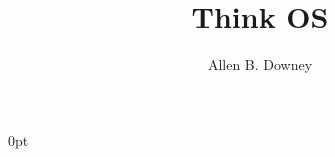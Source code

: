 \documentclass[12pt]{book}
\title{Think OS}
\author{Allen B. Downey}
\newif\ifplastex
\begin{document}
\frontmatter

\ifplastex
    \usepackage{localdef}
    \maketitle

\else


  {\topsep}%
  {\topsep}%
  {}%
  {0pt}%
  {\bfseries}%
  {}%
  { }%
  {}%

\theoremstyle{exercise}
\newtheorem{exercise}{Exercise}[chapter]


\end{document}
